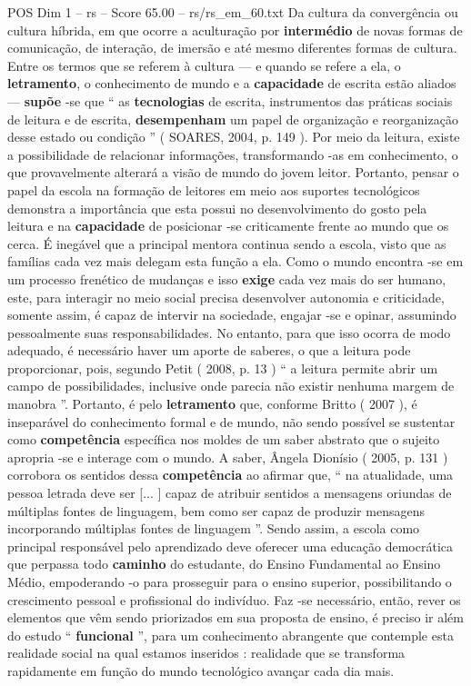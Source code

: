 \begin{textsample}{POS Dim 1 – rs – Score 65.00 – rs/rs\_em\_60.txt}
Da cultura da convergência ou cultura híbrida, em que ocorre a aculturação por \textbf{intermédio} de novas formas de comunicação, de interação, de imersão e até mesmo diferentes formas de cultura.
Entre os termos que se referem à cultura — e quando se refere a ela, o \textbf{letramento}, o conhecimento de mundo e a \textbf{capacidade} de escrita estão aliados — \textbf{supõe} -se que “ as \textbf{tecnologias} de escrita, instrumentos das práticas sociais de leitura e de escrita, \textbf{desempenham} um papel de organização e reorganização desse estado ou condição ” ( SOARES, 2004, p. 149 ).
Por meio da leitura, existe a possibilidade de relacionar informações, transformando -as em conhecimento, o que provavelmente alterará a visão de mundo do jovem leitor.
Portanto, pensar o papel da escola na formação de leitores em meio aos suportes tecnológicos demonstra a importância que esta possui no desenvolvimento do gosto pela leitura e na \textbf{capacidade} de posicionar -se criticamente frente ao mundo que os cerca.
É inegável que a principal mentora continua sendo a escola, visto que as famílias cada vez mais delegam esta função a ela.
Como o mundo encontra -se em um processo frenético de mudanças e isso \textbf{exige} cada vez mais do ser humano, este, para interagir no meio social precisa desenvolver autonomia e criticidade, somente assim, é capaz de intervir na sociedade, engajar -se e opinar, assumindo pessoalmente suas responsabilidades.
No entanto, para que isso ocorra de modo adequado, é necessário haver um aporte de saberes, o que a leitura pode proporcionar, pois, segundo Petit ( 2008, p. 13 ) “ a leitura permite abrir um campo de possibilidades, inclusive onde parecia não existir nenhuma margem de manobra ”.
Portanto, é pelo \textbf{letramento} que, conforme Britto ( 2007 ), é inseparável do conhecimento formal e de mundo, não sendo possível se sustentar como \textbf{competência} específica nos moldes de um saber abstrato que o sujeito apropria -se e interage com o mundo.
A saber, Ângela Dionísio ( 2005, p. 131 ) corrobora os sentidos dessa \textbf{competência} ao afirmar que, “ na atualidade, uma pessoa letrada deve ser [... ] capaz de atribuir sentidos a mensagens oriundas de múltiplas fontes de linguagem, bem como ser capaz de produzir mensagens incorporando múltiplas fontes de linguagem ”.
Sendo assim, a escola como principal responsável pelo aprendizado deve oferecer uma educação democrática que perpassa todo \textbf{caminho} do estudante, do Ensino Fundamental ao Ensino Médio, empoderando -o para prosseguir para o ensino superior, possibilitando o crescimento pessoal e profissional do indivíduo.
Faz -se necessário, então, rever os elementos que vêm sendo priorizados em sua proposta de ensino, é preciso ir além do estudo “ \textbf{funcional} ”, para um conhecimento abrangente que contemple esta realidade social na qual estamos inseridos : realidade que se transforma rapidamente em função do mundo tecnológico avançar cada dia mais.


\end{textsample}
